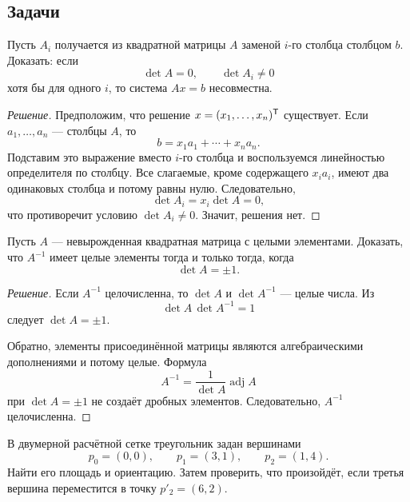 \subsection*{Задачи}

\begin{problem}
Пусть \(A_i\) получается из квадратной матрицы \(A\) заменой \(i\)-го столбца столбцом \(b\). Доказать: если
\[
\det A=0,
\qquad
\det A_i\neq 0
\]
хотя бы для одного \(i\), то система \(Ax=b\) несовместна.
\end{problem}

\begin{proof}[Решение]
Предположим, что решение \(x=(x_1,\dots,x_n)^{\mathsf{T}}\) существует. Если \(a_1,\dots,a_n\) --- столбцы \(A\), то
\[
b=x_1a_1+\cdots+x_na_n.
\]
Подставим это выражение вместо \(i\)-го столбца и воспользуемся линейностью определителя по столбцу. Все слагаемые, кроме содержащего \(x_i a_i\), имеют два одинаковых столбца и потому равны нулю. Следовательно,
\[
\det A_i=x_i\det A=0,
\]
что противоречит условию \(\det A_i\neq 0\). Значит, решения нет.
\end{proof}

\begin{problem}
Пусть \(A\) --- невырожденная квадратная матрица с целыми элементами. Доказать, что \(A^{-1}\) имеет целые элементы тогда и только тогда, когда
\[
\det A=\pm 1.
\]
\end{problem}

\begin{proof}[Решение]
Если \(A^{-1}\) целочисленна, то \(\det A\) и \(\det A^{-1}\) --- целые числа. Из
\[
\det A\,\det A^{-1}=1
\]
следует \(\det A=\pm1\).

Обратно, элементы присоединённой матрицы являются алгебраическими дополнениями и потому целые. Формула
\[
A^{-1}=\frac{1}{\det A}\operatorname{adj}A
\]
при \(\det A=\pm1\) не создаёт дробных элементов. Следовательно, \(A^{-1}\) целочисленна.
\end{proof}

\begin{problem}
В двумерной расчётной сетке треугольник задан вершинами
\[
p_0=(0,0),
\qquad
p_1=(3,1),
\qquad
p_2=(1,4).
\]
Найти его площадь и ориентацию. Затем проверить, что произойдёт, если третья вершина переместится в точку \(p'_2=(6,2)\).
\end{problem}

